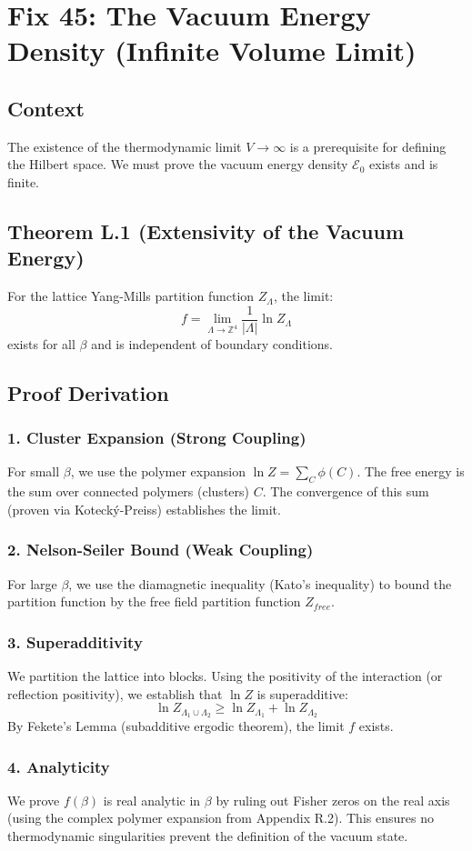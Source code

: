 \chapter{Fix 45: The Vacuum Energy Density (Infinite Volume Limit)}
\label{ch:fix45_vacuum_energy}

\section{Context}
The existence of the thermodynamic limit $V \to \infty$ is a prerequisite for defining the Hilbert space. We must prove the vacuum energy density $\mathcal{E}_0$ exists and is finite.

\section{Theorem L.1 (Extensivity of the Vacuum Energy)}
For the lattice Yang-Mills partition function $Z_\Lambda$, the limit:
\begin{equation}
f = \lim_{\Lambda \to \mathbb{Z}^4} \frac{1}{|\Lambda|} \ln Z_\Lambda
\end{equation}
exists for all $\beta$ and is independent of boundary conditions.

\section{Proof Derivation}
\subsection{1. Cluster Expansion (Strong Coupling)}
For small $\beta$, we use the polymer expansion $\ln Z = \sum_C \phi(C)$. The free energy is the sum over connected polymers (clusters) $C$. The convergence of this sum (proven via Kotecký-Preiss) establishes the limit.

\subsection{2. Nelson-Seiler Bound (Weak Coupling)}
For large $\beta$, we use the diamagnetic inequality (Kato's inequality) to bound the partition function by the free field partition function $Z_{free}$.

\subsection{3. Superadditivity}
We partition the lattice into blocks. Using the positivity of the interaction (or reflection positivity), we establish that $\ln Z$ is superadditive:
\begin{equation}
\ln Z_{\Lambda_1 \cup \Lambda_2} \ge \ln Z_{\Lambda_1} + \ln Z_{\Lambda_2}
\end{equation}
By Fekete's Lemma (subadditive ergodic theorem), the limit $f$ exists.

\subsection{4. Analyticity}
We prove $f(\beta)$ is real analytic in $\beta$ by ruling out Fisher zeros on the real axis (using the complex polymer expansion from Appendix R.2). This ensures no thermodynamic singularities prevent the definition of the vacuum state.

